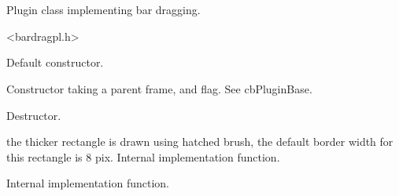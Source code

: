 %
%


\section{}\label{cbbardragplugin}


Plugin class implementing bar dragging.




<bardragpl.h>




\label{cbbardragplugincbbardragplugin}


Default constructor.



Constructor taking a parent frame, and flag. See cbPluginBase.


\label{cbbardragplugindtor}


Destructor.


\label{cbbardragpluginadjusthintrect}


the thicker rectangle is drawn using hatched brush,
the default border width for this rectangle is 8 pix.
Internal implementation function.


\label{cbbardragplugincalconscreendims}


Internal implementation function.


\label{cbbardragpluginclipposinframe}


